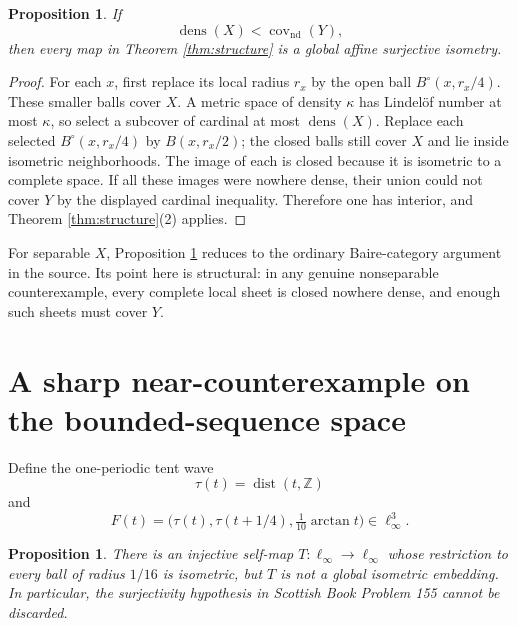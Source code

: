 \documentclass[11pt]{article}
\newtheorem{proposition}[theorem]{Proposition}
\begin{document}
\begin{proposition}\label{prop:category}
If
\[
 \operatorname{dens}(X)<\operatorname{cov}_{\mathrm{nd}}(Y),
\]
then every map in Theorem \ref{thm:structure} is a global affine surjective
isometry.
\end{proposition}

\begin{proof}
For each $x$, first replace its local radius $r_x$ by the open ball
$B^\circ(x,r_x/4)$.  These smaller balls cover $X$.  A metric space of
density $\kappa$ has Lindel\"of number at most $\kappa$, so select a subcover
of cardinal at most $\operatorname{dens}(X)$.  Replace each selected
$B^\circ(x,r_x/4)$ by $B(x,r_x/2)$; the closed balls still cover $X$ and lie
inside isometric neighborhoods.  The image of each is closed because it is
isometric to a complete space.  If all these images were nowhere dense, their
union could not cover $Y$ by the displayed cardinal inequality.  Therefore
one has interior, and Theorem \ref{thm:structure}(2) applies.
\end{proof}

For separable $X$, Proposition \ref{prop:category} reduces to the ordinary
Baire-category argument in the source.  Its point here is structural: in any
genuine nonseparable counterexample, every complete local sheet is closed
nowhere dense, and enough such sheets must cover $Y$.

\section{A sharp near-counterexample on the bounded-sequence space}

Define the one-periodic tent wave
\[
 \tau(t)=\operatorname{dist}(t,\mathbb Z)
\]
and
\[
 F(t)=\bigl(\tau(t),\tau(t+1/4),\tfrac1{10}\arctan t\bigr)
 \in\ell_\infty^3.
\]

\begin{proposition}\label{prop:tent}
There is an injective self-map $T:\ell_\infty\to\ell_\infty$ whose
restriction to every ball of radius $1/16$ is isometric, but $T$ is not a
global isometric embedding.  In particular, the surjectivity hypothesis in
Scottish Book Problem 155 cannot be discarded.
\end{proposition}
\end{document}
